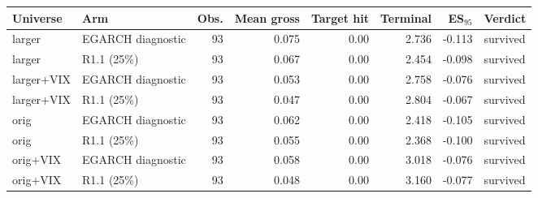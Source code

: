 \begin{tabular}{llrrrrrl}
\toprule
Universe & Arm & Obs. & Mean gross & Target hit & Terminal & ES$_{95}$ & Verdict \\
\midrule
larger & EGARCH diagnostic & 93 & 0.075 & 0.00 & 2.736 & -0.113 & survived \\
larger & R1.1 (25\%) & 93 & 0.067 & 0.00 & 2.454 & -0.098 & survived \\
larger+VIX & EGARCH diagnostic & 93 & 0.053 & 0.00 & 2.758 & -0.076 & survived \\
larger+VIX & R1.1 (25\%) & 93 & 0.047 & 0.00 & 2.804 & -0.067 & survived \\
orig & EGARCH diagnostic & 93 & 0.062 & 0.00 & 2.418 & -0.105 & survived \\
orig & R1.1 (25\%) & 93 & 0.055 & 0.00 & 2.368 & -0.100 & survived \\
orig+VIX & EGARCH diagnostic & 93 & 0.058 & 0.00 & 3.018 & -0.076 & survived \\
orig+VIX & R1.1 (25\%) & 93 & 0.048 & 0.00 & 3.160 & -0.077 & survived \\
\bottomrule
\end{tabular}
